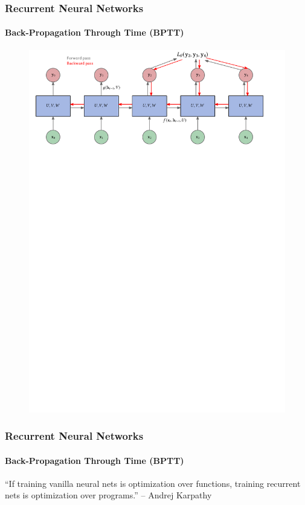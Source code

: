 \documentclass[aspectratio=169]{beamer}
\begin{document}
\begin{frame}
	\frametitle{Recurrent Neural Networks}
	\framesubtitle{Back-Propagation Through Time (BPTT)}
	\begin{figure}
		\includegraphics[width=1.0\textwidth]{bbtt}
	\end{figure}
\end{frame}

\begin{frame}
	\frametitle{Recurrent Neural Networks}
	\framesubtitle{Back-Propagation Through Time (BPTT)}
	\begin{quoting}
		``If training vanilla neural nets is optimization over functions, training recurrent nets is optimization over programs.'' -- Andrej Karpathy
	\end{quoting}
\end{frame}
\end{document}
